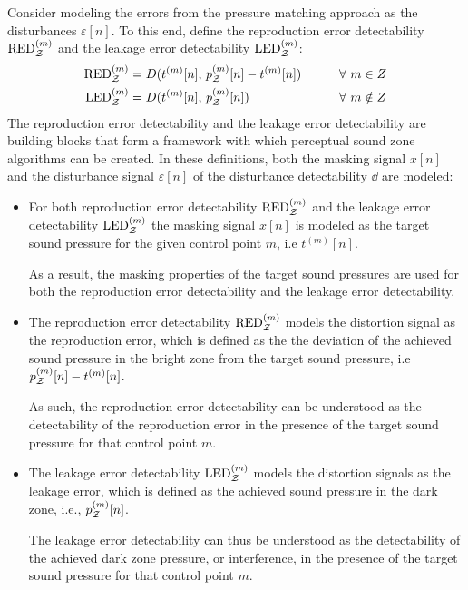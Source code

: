 Consider modeling the errors from the pressure matching approach as the disturbances $\varepsilon[n]$.
To this end, define the reproduction error detectability $\text{RED}^{(m)}_{\mathcal{Z}}$ 
and the leakage error detectability $\text{LED}^{(m)}_{\mathcal{Z}}$:
\begin{alignat}{2}
    \text{RED}^{(m)}_{\mathcal{Z}} &= D(t^{(m)}[n],\,p_{\mathcal{Z}}^{(m)}[n] - t^{(m)}[n]) \qquad&& \forall\,\, m\in Z 
        \label{eq:sound_zone:approach_selection:RED}\\
    \text{LED}^{(m)}_{\mathcal{Z}} &= D(t^{(m)}[n],\,p_{\mathcal{Z}}^{(m)}[n]) \qquad&& \forall\,\, m\notin Z 
        \label{eq:sound_zone:approach_selection:LED} 
\end{alignat}
The reproduction error detectability and the leakage error detectability are building blocks that form a framework
with which perceptual sound zone algorithms can be created.
In these definitions, both the masking signal $x[n]$ and the disturbance signal $\varepsilon[n]$ of the 
disturbance detectability $\dd$ are modeled:  

\begin{itemize}
    \item 
        For both reproduction error detectability $\text{RED}^{(m)}_{\mathcal{Z}}$ 
        and the leakage error detectability $\text{LED}^{(m)}_{\mathcal{Z}}$ the masking signal $x[n]$ is modeled as the target 
        sound pressure for the given control point $m$, i.e $t^{(m)}[n]$. 

        As a result, the masking properties of the target sound pressures are used for both the reproduction error detectability and the leakage error detectability.
    \item 
        The reproduction error detectability $\text{RED}^{(m)}_{\mathcal{Z}}$ models the distortion signal 
        as the reproduction error, which is defined as the 
        the deviation of the achieved sound pressure in the bright zone from the target sound pressure, i.e 
        $p_{\mathcal{Z}}^{(m)}[n] - t^{(m)}[n]$. 

        As such, the reproduction error detectability can be understood as the detectability of the reproduction error in the presence of the target sound pressure for that control point $m$.
    \item 
        The leakage error detectability $\text{LED}^{(m)}_{\mathcal{Z}}$ models the distortion signals
        as the leakage error, which is defined as the achieved sound pressure in the dark zone, i.e., $p_{\mathcal{Z}}^{(m)}[n]$.  

        The leakage error detectability can thus be understood as the detectability of the achieved dark zone pressure, or interference, in the presence of the target sound pressure for that control point $m$.
\end{itemize}

